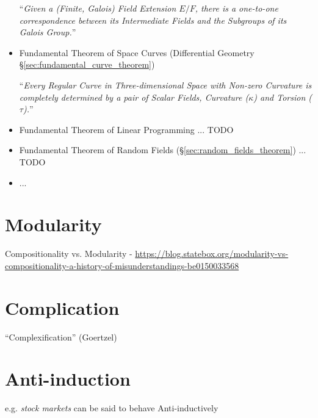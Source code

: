 \begin{itemize}
    ``\emph{Given a (Finite, Galois) Field Extension $E/F$, there is a
    one-to-one correspondence between its Intermediate Fields and the Subgroups
    of its Galois Group.}''

  \item Fundamental Theorem of Space Curves
    (Differential Geometry \S\ref{sec:fundamental_curve_theorem})

    ``\emph{Every Regular Curve in Three-dimensional Space with Non-zero
    Curvature is completely determined by a pair of Scalar Fields, Curvature
    ($\kappa$) and Torsion ($\tau$).}''

  \item Fundamental Theorem of Linear Programming ... TODO

  \item Fundamental Theorem of Random Fields (\S\ref{sec:random_fields_theorem})
    ... TODO
  \item ...
\end{itemize}



\section{Modularity}\label{sec:modularity}

Compositionality vs. Modularity -
\url{https://blog.statebox.org/modularity-vs-compositionality-a-history-of-misunderstandings-be0150033568}



\section{Complication}\label{sec:complication}

``Complexification'' (Goertzel)



\section{Anti-induction}\label{sec:anti_induction}

e.g. \emph{stock markets} can be said to behave Anti-inductively
